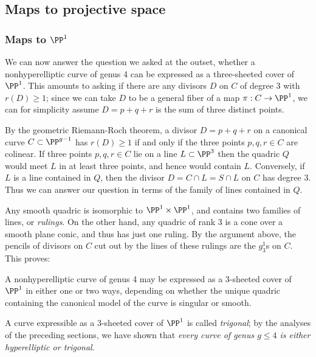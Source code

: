 \subsection{Maps to projective space}

\subsubsection{Maps to $\PP^1$}

We can now answer the question we asked at the outset, whether a nonhyperelliptic curve of genus 4 can be expressed as a three-sheeted cover of $\PP^1$. This amounts to asking if there are any divisors $D$ on $C$ of degree 3 with $r(D) \geq 1$; since we can take $D$ to be a general fiber of a map $\pi : C \to \PP^1$, we can for simplicity assume $D = p+q+r$ is the sum of three distinct points.

By the geometric Riemann-Roch theorem, a divisor $D = p+q+r$ on a canonical curve $C \subset \PP^{g-1}$ has $r(D) \geq 1$ if and only if the three points $p,q,r \in C$ are colinear. If three points $p,q,r \in C$ lie on a line $L \subset \PP^3$ then the quadric $Q$ would meet $L$ in at least three points, and hence would contain $L$. Conversely,  if $L$ is a line contained in $Q$, then the divisor $D = C \cap L = S \cap L$ on $C$ has degree  3. Thus we can answer our question in terms of the family of lines contained in $Q$.

Any smooth quadric is isomorphic to $\PP^1\times \PP^1$, and contains two families of lines, or \emph{rulings}. On the other hand, any  quadric of rank 3 is a cone over a smooth plane conic, and thus has just one ruling. By the argument above, the pencils of divisors on $C$ cut out by the lines of these rulings are the $g^1_3$s on $C$. This proves:

\begin{proposition}\label{genus 4 trigonal}
A nonhyperelliptic curve of genus 4 may be expressed as a 3-sheeted cover of $\PP^1$ in either one or two ways, depending on whether the unique quadric containing the canonical model of the curve is singular or smooth.
\end{proposition}
 
 
A curve expressible as a 3-sheeted cover of $\PP^1$ is called \emph{trigonal}; by the analyses of the preceding sections, we have shown that \emph{every curve of genus $g \leq 4$ is either hyperelliptic or trigonal}. 

